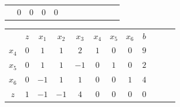 \begin{frame}
{\begin{table}
\begin{tabular}{c c c c c c c c c c c c}
			& \cellcolor{yellow!60}  $ \scriptstyle 0$
			& \cellcolor{yellow!60}  $ \scriptstyle 0$
			& \cellcolor{yellow!60}  $ \scriptstyle 0$ 
			& \cellcolor{yellow!60}  $ \scriptstyle 0$ \\
		\end{tabular}
	\end{table}
	}	
	{
		\begin{table}
			\begin{tabular}{c c c c c c c c c c c c}
				& \cellcolor{blue!80} \color{white} $ \scriptstyle z$
				& \cellcolor{blue!80} \color{white} $ \scriptstyle x_1$ 
				& \cellcolor{blue!80} \color{white} $ \scriptstyle x_2$
				& \cellcolor{blue!80} \color{white} $ \scriptstyle x_3$
				& \cellcolor{blue!80} \color{red} $ \scriptstyle x_4$
				& \cellcolor{blue!80} \color{red} $ \scriptstyle x_5$
				& \cellcolor{blue!80} \color{red} $ \scriptstyle x_6$ 
				& \cellcolor{blue!80} \color{white} $ \scriptstyle b$ \\
				\cellcolor{blue!80} \color{red} $ \scriptstyle x_4$
				& \cellcolor{yellow!60}  $ \scriptstyle 0$
				& \cellcolor{yellow!60}  $ \scriptstyle 1$ 
				& \cellcolor{yellow!60}  $ \scriptstyle 1$
				& \cellcolor{gray!60}  $ \scriptstyle 2$
				& \cellcolor{yellow!60}  $ \scriptstyle 1$
				& \cellcolor{yellow!60}  $ \scriptstyle 0$
				& \cellcolor{yellow!60}  $ \scriptstyle 0$ 
				& \cellcolor{yellow!60}  $ \scriptstyle 9$ \\ 
				\cellcolor{blue!80} \color{red} $ \scriptstyle x_5$  
				& \cellcolor{yellow!60}  $ \scriptstyle 0$
				& \cellcolor{yellow!60}  $ \scriptstyle 1$ 
				& \cellcolor{yellow!60}  $ \scriptstyle 1$
				& \cellcolor{gray!60}  $ \scriptstyle -1$
				& \cellcolor{yellow!60}  $ \scriptstyle 0$
				& \cellcolor{yellow!60}  $ \scriptstyle 1$
				& \cellcolor{yellow!60}  $ \scriptstyle 0$ 
				& \cellcolor{yellow!60}  $ \scriptstyle 2$ \\
				\cellcolor{blue!80} \color{red} $ \scriptstyle x_6$
				& \cellcolor{yellow!60}  $ \scriptstyle 0$
				& \cellcolor{yellow!60}  $ \scriptstyle -1$ 
				& \cellcolor{yellow!60}  $ \scriptstyle 1$
				& \cellcolor{gray!60}  $ \scriptstyle 1$
				& \cellcolor{yellow!60}  $ \scriptstyle 0$
				& \cellcolor{yellow!60}  $ \scriptstyle 0$
				& \cellcolor{yellow!60}  $ \scriptstyle 1$ 
				& \cellcolor{yellow!60}  $ \scriptstyle 4$ \\
				\cellcolor{blue!80} \color{white} $ \scriptstyle z$
				& \cellcolor{yellow!60}  $ \scriptstyle 1$
				& \cellcolor{yellow!60}  $ \scriptstyle -1$ 
				& \cellcolor{yellow!60}  $ \scriptstyle -1$
				& \cellcolor{gray!60}  $ \scriptstyle 4$
				& \cellcolor{yellow!60}  $ \scriptstyle 0$
				& \cellcolor{yellow!60}  $ \scriptstyle 0$
				& \cellcolor{yellow!60}  $ \scriptstyle 0$ 
				& \cellcolor{yellow!60}  $ \scriptstyle 0$ \\
				

\end{tabular}
\end{table}}
\end{frame}
